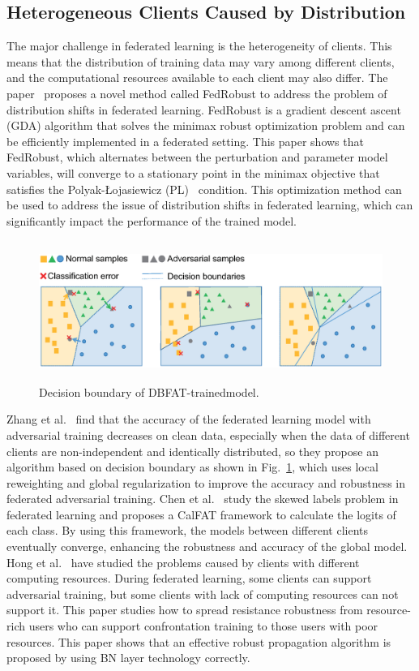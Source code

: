 \documentclass[pdflatex,sn-mathphys-num]{sn-jnl}%
\theoremstyle{thmstyleone}%
\theoremstyle{thmstyletwo}%
\theoremstyle{thmstylethree}%
\begin{document}
\subsection{Heterogeneous Clients Caused by Distribution}
The major challenge in federated learning is the
heterogeneity of clients. This means that the distribution of
training data may vary among different clients, and the
computational resources available to each client may also
differ. The paper~\cite{reisizadeh2020robust} proposes a novel method called
FedRobust to address the problem of distribution shifts
in federated learning. FedRobust is a gradient descent
ascent (GDA) algorithm that solves the minimax robust
optimization problem and can be eﬀiciently implemented
in a federated setting. This paper shows that FedRobust,
which alternates between the perturbation and parameter
model variables, will converge to a stationary point in the
minimax objective that satisfies the Polyak-Łojasiewicz
(PL)~\cite{polyak1963gradient} condition. This optimization method can be
used to address the issue of distribution shifts in federated
learning, which can significantly impact the performance
of the trained model.

\begin{figure}[h]
	\centering
	\includegraphics[width=1.0\linewidth,height=1.8in]{output/fig21.eps}
	\caption{Decision boundary of DBFAT-trainedmodel.}
	\label{fig21}
\end{figure}


Zhang et al.~\cite{zhang2023delving} find that the accuracy of the federated
learning model with adversarial training decreases on
clean data, especially when the data of different clients
are non-independent and identically distributed, so they
propose an algorithm based on decision boundary as
shown in Fig.~\ref{fig21}, which uses local reweighting and global
regularization to improve the accuracy and robustness in
federated adversarial training. Chen et al.~\cite{chen2022calfat} study the
skewed labels problem in federated learning and proposes
a CalFAT framework to calculate the logits of each class.
By using this framework, the models between different
clients eventually converge, enhancing the robustness and
accuracy of the global model.
Hong et al.~\cite{hong2021federated} have studied the problems caused
by clients with different computing resources. During
federated learning, some clients can support adversarial
training, but some clients with lack of computing resources
can not support it. This paper studies how to spread
resistance robustness from resource-rich users who can
support confrontation training to those users with poor
resources. This paper shows that an effective robust
propagation algorithm is proposed by using BN layer
technology correctly.
\end{document}
